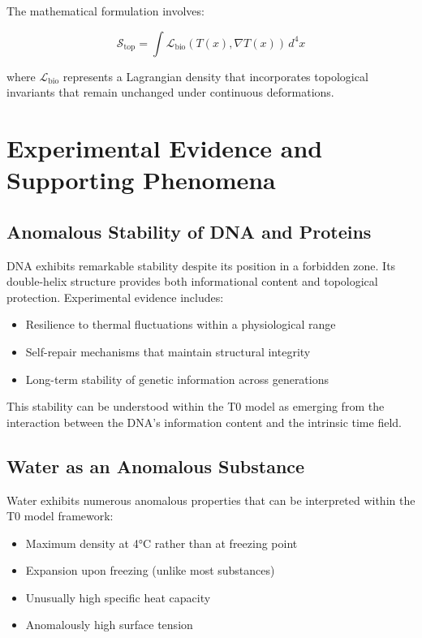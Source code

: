 \documentclass[12pt,a4paper]{article}
\newcommand{\Tfield}{T(x)}
\begin{document}
	The mathematical formulation involves:
	
	\begin{equation}
		\mathcal{S}_{\text{top}} = \int \mathcal{L}_{\text{bio}}(\Tfield, \nabla\Tfield) \, d^4x
	\end{equation}
	
	where \(\mathcal{L}_{\text{bio}}\) represents a Lagrangian density that incorporates topological invariants that remain unchanged under continuous deformations.
	
	\section{Experimental Evidence and Supporting Phenomena}
	\label{sec:experimental_evidence}
	
	\subsection{Anomalous Stability of DNA and Proteins}
	\label{subsec:dna_stability}
	
	DNA exhibits remarkable stability despite its position in a forbidden zone. Its double-helix structure provides both informational content and topological protection. Experimental evidence includes:
	
	\begin{itemize}
		\item Resilience to thermal fluctuations within a physiological range
		\item Self-repair mechanisms that maintain structural integrity
		\item Long-term stability of genetic information across generations
	\end{itemize}
	
	This stability can be understood within the T0 model as emerging from the interaction between the DNA's information content and the intrinsic time field.
	
	\subsection{Water as an Anomalous Substance}
	\label{subsec:water_anomalies}
	
	Water exhibits numerous anomalous properties that can be interpreted within the T0 model framework:
	
	\begin{itemize}
		\item Maximum density at 4°C rather than at freezing point
		\item Expansion upon freezing (unlike most substances)
		\item Unusually high specific heat capacity
		\item Anomalously high surface tension
	\end{itemize}
	
\end{document}
